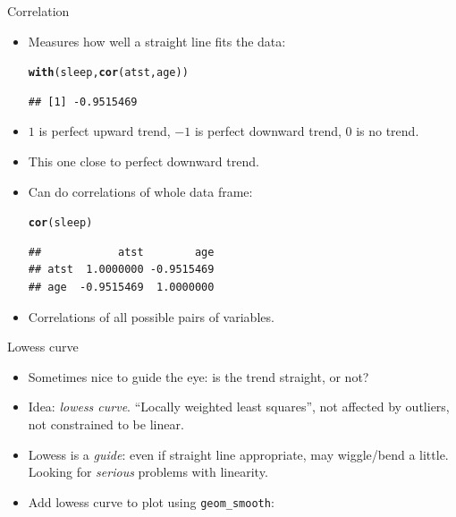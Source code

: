 \documentclass[unknownkeysallowed]{beamer}\usepackage[]{graphicx}\usepackage[]{color}
\makeatletter
\newcommand{\hlstd}[1]{\textcolor[rgb]{0.345,0.345,0.345}{#1}}%
\newcommand{\hlkwd}[1]{\textcolor[rgb]{0.737,0.353,0.396}{\textbf{#1}}}%
\newenvironment{kframe}{%
 \def\at@end@of@kframe{}%
 \ifinner\ifhmode%
  \def\at@end@of@kframe{\end{minipage}}%
  \begin{minipage}{\columnwidth}%
 \fi\fi%
 \def\FrameCommand##1{\hskip\@totalleftmargin \hskip-\fboxsep
 \colorbox{shadecolor}{##1}\hskip-\fboxsep
     \hskip-\linewidth \hskip-\@totalleftmargin \hskip\columnwidth}%
 \MakeFramed {\advance\hsize-\width
   \@totalleftmargin\z@ \linewidth\hsize
   \@setminipage}}%
 {\par\unskip\endMakeFramed%
 \at@end@of@kframe}
\newenvironment{knitrout}{}{} %
\makeatother
\begin{document}
\begin{frame}[fragile]{Correlation}
  
  \begin{itemize}
  \item Measures how well a straight line fits the data:
 
\begin{knitrout}
\color{fgcolor}\begin{kframe}
\begin{alltt}
\hlkwd{with}\hlstd{(sleep,}\hlkwd{cor}\hlstd{(atst,age))}
\end{alltt}
\begin{verbatim}
## [1] -0.9515469
\end{verbatim}
\end{kframe}
\end{knitrout}

\item $1$ is perfect upward trend, $-1$ is perfect downward trend, 0
  is no trend.
\item This one close to perfect downward trend.
\item Can do correlations of whole data frame:
 
\begin{knitrout}
\color{fgcolor}\begin{kframe}
\begin{alltt}
\hlkwd{cor}\hlstd{(sleep)}
\end{alltt}
\begin{verbatim}
##            atst        age
## atst  1.0000000 -0.9515469
## age  -0.9515469  1.0000000
\end{verbatim}
\end{kframe}
\end{knitrout}
\item Correlations of all possible pairs of variables.  
    
  \end{itemize}
  
\end{frame}


\begin{frame}[fragile]{Lowess curve}
  
  \begin{itemize}
  \item Sometimes nice to guide the eye: is the trend straight, or not?

  \item Idea: \emph{lowess curve}. ``Locally weighted least squares'',
    not affected by outliers, not constrained to be linear.
  \item Lowess is a \emph{guide}: even if straight line appropriate,
    may wiggle/bend a little. Looking for \emph{serious} problems with
    linearity. 
  \item Add lowess curve to plot using \texttt{geom\_smooth}:
 
    
  \end{itemize}
  
\end{frame}
\end{document}
